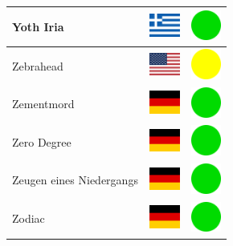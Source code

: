 \documentclass[12pt, a4paper, twoside]{report}
\begin{document}
\begin{center}
\begin{longtable}{|p{5cm}|p{2cm}|p{2cm}|}
 Yoth Iria                                                  & \includegraphics[width=1cm]{../img/flags/gr} &   \includegraphics[width=1cm]{../likes/y} \\ \hline
 Zebrahead                                                  & \includegraphics[width=1cm]{../img/flags/us} &   \includegraphics[width=1cm]{../likes/m} \\ \hline
 Zementmord                                                 & \includegraphics[width=1cm]{../img/flags/de} &   \includegraphics[width=1cm]{../likes/y} \\ \hline
 Zero Degree                                                & \includegraphics[width=1cm]{../img/flags/de} &   \includegraphics[width=1cm]{../likes/y} \\ \hline
 Zeugen eines Niedergangs                                   & \includegraphics[width=1cm]{../img/flags/de} &   \includegraphics[width=1cm]{../likes/y} \\ \hline
 Zodiac                                                     & \includegraphics[width=1cm]{../img/flags/de} &   \includegraphics[width=1cm]{../likes/y} \\ \hline

\end{longtable}
\end{center}
\end{document}
